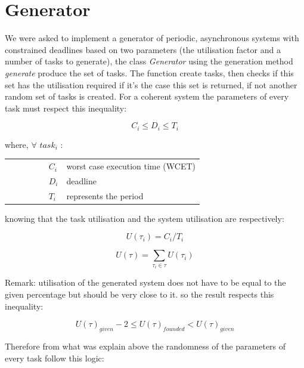 \documentclass[letterpaper]{article}
\makeatletter
\newenvironment{conditions}
  {\par\vspace{\abovedisplayskip}\noindent\begin{tabular}
  {>{$}l<{$} @{${}={}$} l}}
  {\end{tabular}\par\vspace{\belowdisplayskip}}
\makeatother
\begin{document}
\section{Generator}

We were asked to implement a generator of periodic, asynchronous
systems with constrained deadlines based on two parameters
(the utilisation factor and a  number of tasks to generate),
the class \textit{Generator} using the generation method \textit{generate}
produce the set of tasks. The function create tasks, then checks if this
set has the utilisation required if it's the case this set is returned,
if not another random set of tasks is created. For a coherent system
the parameters of every task must respect this inequality:

\begin{equation*}
C_{i} \leq D_{i} \leq T_{i}
\end{equation*}



where, $\forall$  $task_{i}$ :

\begin{conditions}
\hspace{2cm}   C_{i}   &  worst case execution time (WCET)  \\
\hspace{2cm}    D_{i}  &  deadline   \\
\hspace{2cm}    T_{i} &  represents the period
\end{conditions}

knowing that the task utilisation and the system utilisation are respectively:

\begin{equation*}
    U(\tau_{i}) = C_{i} / T_{i}
\end{equation*}


\begin{equation*}
U(\tau) = \sum_{\tau_{i} \in \tau} U(\tau_{i})
\end{equation*}

Remark: utilisation of the generated system
does not have to be equal to the given percentage
but should be very close to it. so the result respects this inequality:

\begin{equation*}
U(\tau)_{given} - 2 \leq U(\tau)_{founded} < U(\tau)_{given}
\end{equation*}



Therefore from what was explain above the randomness
of the parameters of every task follow this logic:
\end{document}

